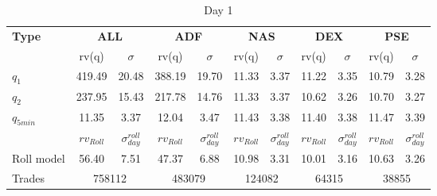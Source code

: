 \documentclass{article}
\begin{document}
\begin{table}[H]
\centering
\begin{adjustbox}{width=\textwidth}
\begin{tabular}{lcccccccccc}
\toprule
\textbf{Type} & \multicolumn{2}{c}{\textbf{ALL}} & \multicolumn{2}{c}{\textbf{ADF}} & \multicolumn{2}{c}{\textbf{NAS}} & \multicolumn{2}{c}{\textbf{DEX}} & \multicolumn{2}{c}{\textbf{PSE}} \\
\cmidrule(lr){2-3} \cmidrule(lr){4-5} \cmidrule(lr){6-7} \cmidrule(lr){8-9} \cmidrule(lr){10-11}
 & rv(q) & $\sigma$ & rv(q) & $\sigma$ & rv(q) & $\sigma$ & rv(q) & $\sigma$ & rv(q) & $\sigma$ \\
\midrule
$q_1$       & 419.49 & 20.48 & 388.19 & 19.70 & 11.33 & 3.37  & 11.22 & 3.35  & 10.79 & 3.28  \\
$q_2$       & 237.95 & 15.43 & 217.78 & 14.76 & 11.33 & 3.37  & 10.62 & 3.26  & 10.70 & 3.27  \\
$q_{5min}$   & 11.35  & 3.37  & 12.04  & 3.47  & 11.43 & 3.38  & 11.40 & 3.38  & 11.47 & 3.39  \\
\midrule
& {$rv_{Roll}$} & {$\sigma_{day}^{roll}$} & {$rv_{Roll}$} & {$\sigma_{day}^{roll}$} & {$rv_{Roll}$} & {$\sigma_{day}^{roll}$}& {$rv_{Roll}$} & {$\sigma_{day}^{roll}$}& {$rv_{Roll}$} & {$\sigma_{day}^{roll}$} \\
Roll model & 56.40  & 7.51  & 47.37  & 6.88  & 10.98 & 3.31  & 10.01 & 3.16  & 10.63 & 3.26  \\
Trades     & \multicolumn{2}{c}{758112} & \multicolumn{2}{c}{483079} & \multicolumn{2}{c}{124082} & \multicolumn{2}{c}{64315} & \multicolumn{2}{c}{38855} \\
\bottomrule
\end{tabular}
\end{adjustbox}
\caption{Day 1}
\label{tab:summary_table}
\end{table}
\end{document}
